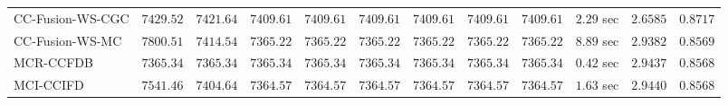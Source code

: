 \begin{table}[H]
\begin{tabular}{lrrrrrrrrrrr}
    CC-Fusion-WS-CGC & $      7429.52$ & $      7421.64$ & $      7409.61$ & $      7409.61$ & $      7409.61$ & $      7409.61$ & $      7409.61$ & $      7409.61$ & $         2.29$ sec    & $       2.6585$  & $       0.8717$ \\ 
     CC-Fusion-WS-MC & $      7800.51$ & $      7414.54$ & $      7365.22$ & $      7365.22$ & $      7365.22$ & $      7365.22$ & $      7365.22$ & $      7365.22$ & $         8.89$ sec    & $       2.9382$  & $       0.8569$ \\ 
\cmidrule{1-1} 
           MCR-CCFDB & $      7365.34$ & $      7365.34$ & $      7365.34$ & $      7365.34$ & $      7365.34$ & $      7365.34$ & $      7365.34$ & $      7365.34$ & $         0.42$ sec    & $       2.9437$  & $       0.8568$ \\ 
\cmidrule{1-1} 
           MCI-CCIFD & $      7541.46$ & $      7404.64$ & $      7364.57$ & $      7364.57$ & $      7364.57$ & $      7364.57$ & $      7364.57$ & $      7364.57$ & $         1.63$ sec    & $       2.9440$  & $       0.8568$ \\ 
\bottomrule
\end{tabular}
\end{table}

